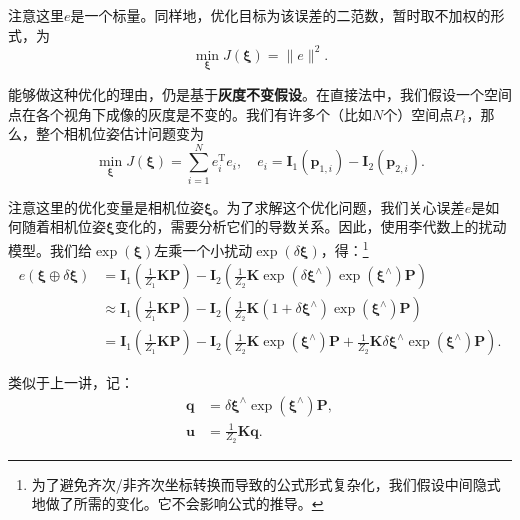 注意这里$e$是一个标量。同样地，优化目标为该误差的二范数，暂时取不加权的形式，为
\clearpage
\begin{equation}
\mathop {\min }\limits_{\bm{\xi}}  J\left( \bm{\xi}  \right) = \|e\|^2.
\end{equation}

能够做这种优化的理由，仍是基于\textbf{灰度不变假设}。在直接法中，我们假设一个空间点在各个视角下成像的灰度是不变的。我们有许多个（比如$N$个）空间点$P_i$，那么，整个相机位姿估计问题变为
\begin{equation}
\mathop {\min }\limits_{\bm{\xi}}  J\left( \bm{\xi}  \right) = \sum\limits_{i = 1}^N {e_i^\mathrm{T}{e_i}}, \quad {e_i} = { \bm{I}_1}\left( {{\bm{p}_{1,i}}} \right) - {\bm{I}_2}\left( {{ \bm{p}_{2,i}}} \right).
\end{equation}

注意这里的优化变量是相机位姿$\bm{\xi}$。为了求解这个优化问题，我们关心误差$e$是如何随着相机位姿$\bm{\xi}$变化的，需要分析它们的导数关系。因此，使用李代数上的扰动模型。我们给$\exp (\bm{\xi})$左乘一个小扰动$\exp( \delta \bm{\xi} )$，得：\footnote{为了避免齐次/非齐次坐标转换而导致的公式形式复杂化，我们假设中间隐式地做了所需的变化。它不会影响公式的推导。}
\begin{align*}
e\left( { \bm{\xi}  \oplus \delta \bm{\xi} } \right) &= { \bm{I} _1}\left( {\frac{1}{{{Z_1}}} \bm{KP} } \right) - {\bm{I}_2}\left( {\frac{1}{{{Z_2}}} \bm{K}\exp \left( {\delta {\bm{\xi} ^ \wedge }} \right)\exp \left( {{\bm{\xi} ^ \wedge }} \right) {\bm{P}}} \right)\\
& \approx {\bm{I}_1}\left( {\frac{1}{{{Z_1}}} \bm{KP}} \right) - {\bm{I}_2}\left( {\frac{1}{{{Z_2}}} \bm{K} \left( {1 + \delta {\bm{\xi} ^ \wedge }} \right)\exp \left( {{ \bm{\xi} ^ \wedge }} \right) {\bm{P}} } \right)\\
&= {\bm{I}_1}\left( {\frac{1}{{{Z_1}}} \bm{KP}} \right) - {\bm{I}_2}\left( {\frac{1}{{{Z_2}}} \bm{K}\exp \left( {{\bm{\xi} ^ \wedge }} \right) \bm{P} + \frac{1}{{{Z_2}}} \bm{K} \delta { \bm{\xi} ^ \wedge }\exp \left( {{\bm{\xi} ^ \wedge }} \right) {\bm{P}}} \right).
\end{align*}

类似于上一讲，记：
\begin{align*}
\bm{q} &= \delta \bm{\xi} ^\wedge \exp \left( {{ \bm{\xi} ^ \wedge }} \right) \bm{P}, \\
\bm{u} &= \frac{1}{{{Z_2}}} \bm{K} \bm{q}.
\end{align*}

